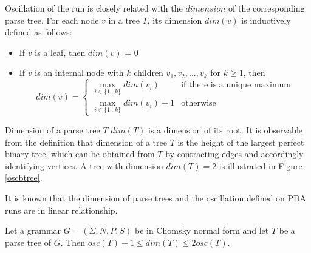 Oscillation of the run is closely related with the $dimension$ of the corresponding parse tree. For each node $v$ in a tree $T$, its dimension $dim(v)$ is inductively defined as follows:
\begin{itemize}
\item If $v$ is a leaf, then $dim(v)$ = 0
\item If $v$ is an internal node with $k$ children $v_1, v_2, ..., v_k$ for $k \ge 1$, then 
$$
dim(v) = 
 \begin{cases}
   \max_{i \in \{1...k\}}dim(v_i) &\text{if there is a unique maximum}\\
   \max_{i \in \{1...k\}}dim(v_i)+1 &\text{otherwise}
 \end{cases}
$$
\end{itemize}


Dimension of a parse tree $T$ $dim(T)$ is a dimension of its root.  It is observable from the definition that dimension of a tree $T$ is the height of the largest perfect binary tree, which can be obtained from $T$ by contracting edges and accordingly identifying vertices. A tree with dimension $dim(T) = 2$ is illustrated in Figure \ref{oscbtree}.


It is known that the dimension of parse trees and the oscillation defined on PDA runs are in linear relationship.

\begin{lemma}
\label{boscdim}
Let a grammar $G = (\Sigma, N, P, S)$ be in Chomsky normal form and let $T$ be a parse tree of $G$. Then $osc(T) - 1 \le dim(T) \le 2osc(T)$.
\end{lemma}

